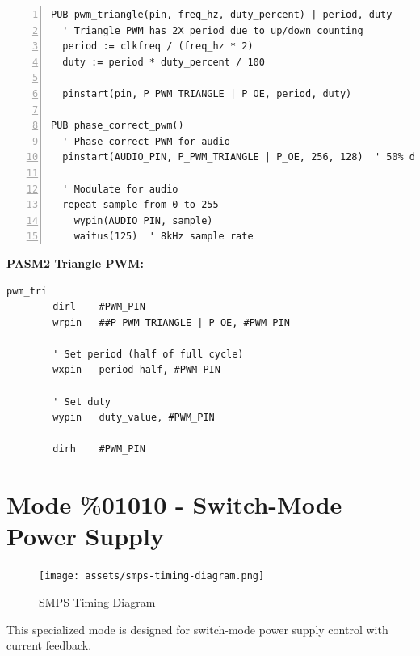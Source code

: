 \documentclass[11pt,a4paper,oneside,english]{book}
\begin{document}
\begin{Spin2Block}
\begin{Verbatim}[numbers=left,numbersep=5pt,xleftmargin=15pt]
PUB pwm_triangle(pin, freq_hz, duty_percent) | period, duty
  ' Triangle PWM has 2X period due to up/down counting
  period := clkfreq / (freq_hz * 2)
  duty := period * duty_percent / 100
  
  pinstart(pin, P_PWM_TRIANGLE | P_OE, period, duty)

PUB phase_correct_pwm()
  ' Phase-correct PWM for audio
  pinstart(AUDIO_PIN, P_PWM_TRIANGLE | P_OE, 256, 128)  ' 50% duty
  
  ' Modulate for audio
  repeat sample from 0 to 255
    wypin(AUDIO_PIN, sample)
    waitus(125)  ' 8kHz sample rate
\end{Verbatim}
\end{Spin2Block}

\textbf{PASM2 Triangle PWM:}

\begin{PASM2Block}
\begin{lstlisting}
pwm_tri
        dirl    #PWM_PIN
        wrpin   ##P_PWM_TRIANGLE | P_OE, #PWM_PIN
        
        ' Set period (half of full cycle)
        wxpin   period_half, #PWM_PIN
        
        ' Set duty
        wypin   duty_value, #PWM_PIN
        
        dirh    #PWM_PIN
\end{lstlisting}
\end{PASM2Block}

\clearpage

\hypertarget{mode-01010---switch-mode-power-supply}{%
\section{Mode \%01010 - Switch-Mode Power
Supply}\label{mode-01010---switch-mode-power-supply}}

\begin{figure}
\centering
\texttt{[image: assets/smps-timing-diagram.png]}
\caption{SMPS Timing Diagram}
\end{figure}

This specialized mode is designed for switch-mode power supply control
with current feedback.
\end{document}
